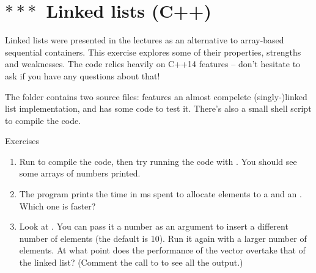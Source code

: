 \section{$\ast\ast\ast$~Linked lists (C++)}

Linked lists were presented in the lectures as an alternative to array-based sequential containers. This exercise explores some of their properties, strengths and weaknesses. The code relies heavily on \mbox{C++14} features -- don't hesitate to ask if you have any questions about that!

The folder  contains two source files:  features an almost compelete (singly-)linked list implementation, and  has some code to test it. There's also a small shell script to compile the code.
%
\begin{mybox}{Exercises}
    \begin{enumerate}
        \item Run  to compile the code, then try running the code with . You should see some arrays of numbers printed.
        \item The program prints the time in ms spent to allocate elements to a  and an . Which one is faster?
        \item Look at . You can pass it a number as an argument to insert a different number of elements (the default is 10). Run it again with a larger number of elements. At what point does the performance of the vector overtake that of the linked list? (Comment the call to  to see all the output.)
    \end{enumerate}
\end{mybox}

